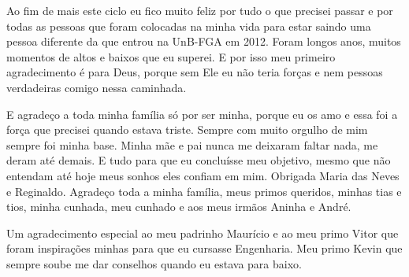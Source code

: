 \begin{agradecimentos}







Ao fim de mais este ciclo eu fico muito feliz por tudo o que precisei passar e por todas as pessoas que foram colocadas na minha vida para estar saindo uma pessoa diferente da que entrou na UnB-FGA em 2012. Foram longos anos, muitos momentos de altos e baixos que eu superei. E por isso meu primeiro agradecimento é para Deus, porque sem Ele eu não teria forças e nem pessoas verdadeiras comigo nessa caminhada.




E agradeço a toda minha família só por ser minha, porque eu os amo e essa foi a força que precisei quando estava triste. Sempre com muito orgulho de mim sempre foi minha base. Minha mãe e pai nunca me deixaram faltar nada, me deram até demais. E tudo para que eu concluísse meu objetivo, mesmo que não entendam até hoje meus sonhos eles confiam em mim. Obrigada Maria das Neves e Reginaldo. Agradeço toda a minha família, meus primos queridos, minhas tias e tios, minha cunhada, meu cunhado e aos meus irmãos Aninha e André. 

Um agradecimento especial ao meu padrinho Maurício e ao meu primo Vitor que foram inspirações minhas para que eu cursasse Engenharia. Meu primo Kevin que sempre soube me dar conselhos quando eu estava para baixo. 




\end{agradecimentos}
